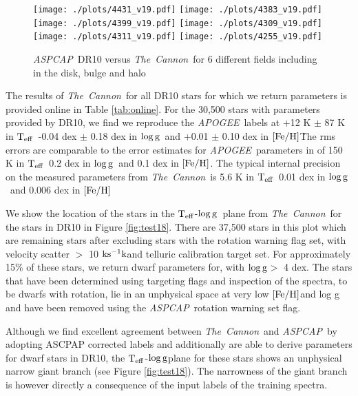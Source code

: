 \documentclass[12pt, preprint]{aastex}
\newcommand{\teff}{\mbox{$\rm T_{eff}$}}
\newcommand{\kms}{\mbox{$\rm ks^{-1} k$}}
\newcommand{\feh}{\mbox{$\rm [Fe/H]$}}
\newcommand{\logg}{\mbox{$\rm \log g$}}
\newcommand{\tc}{\textsl{The~Cannon}}
\newcommand{\apogee}{\textsl{APOGEE}}
\newcommand{\aspcap}{\textsl{ASPCAP}}
\begin{document}
\begin{figure}[h!]
\centering
  \texttt{[image: ./plots/4431\_v19.pdf]}
    \texttt{[image: ./plots/4383\_v19.pdf]} \\
      \texttt{[image: ./plots/4399\_v19.pdf]}
        \texttt{[image: ./plots/4309\_v19.pdf]} \\
              \texttt{[image: ./plots/4311\_v19.pdf]}
        \texttt{[image: ./plots/4255\_v19.pdf]} \\
\caption{\small{\aspcap\ DR10 versus \tc\ for 6 different fields including in the disk, bulge and halo}}
\label{fig:cal}
\end{figure}


The results of \tc\ for all DR10 stars for which we return parameters is provided online in Table \ref{tab:online}. For the 30,500 stars with parameters provided by DR10, we find we reproduce the \apogee\ labels at +12 K $\pm$ 87 K in \teff\, -0.04 dex $\pm$  0.18 dex in \logg\ and +0.01 $\pm$ 0.10 dex in \feh\. The rms errors are comparable to the error estimates for \apogee\ parameters in \citet{Meszaros2013} of 150 K in \teff\, 0.2 dex in \logg\ and 0.1 dex in \feh.  The typical internal precision on the measured parameters from \tc\ is 5.6 K in \teff\, 0.01 dex in \logg\ and 0.006 dex in \feh\ 

We show the location of the stars in the \teff-\logg\ plane from \tc\ for the stars in DR10 in Figure \ref{fig:test18}. There are 37,500 stars in this plot which are remaining stars after excluding stars with the  rotation warning flag set, with velocity scatter $>$ 10 \kms and telluric calibration target set. For approximately 15\% of these stars, we return dwarf parameters for, with \logg $>$ 4 dex.  The stars that have been determined using targeting flags and inspection of the spectra, to be dwarfs with rotation, lie in an unphysical space at very low \feh and log g and have been removed using the \aspcap\ rotation warning set flag.

Although we find excellent agreement between \tc\ and \aspcap\ by adopting ASCPAP corrected labels and additionally are able to derive parameters for dwarf stars in DR10, the \teff-\logg plane for these stars shows an unphysical narrow giant branch  (see Figure \ref{fig:test18}). The narrowness of the giant branch is however directly a consequence of the input labels of the training spectra. 

\end{document}
